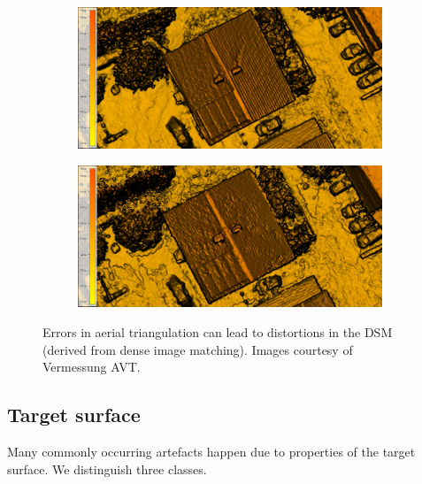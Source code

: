 \begin{figure}
	\begin{subfigure}{0.45\linewidth}
		\includegraphics[width=\textwidth]{figs/Roof_DSM_NA_10cm.jpg}
		\label{fig:dim:b}
	\end{subfigure}
	\quad
	\begin{subfigure}{0.45\linewidth}
		\includegraphics[width=\textwidth]{figs/Roof_DSM_NA+OBL_10cm.jpg}
		\label{fig:dim:c}
	\end{subfigure}
	\caption{Errors in aerial triangulation can lead to distortions in the DSM (derived from dense image matching). Images courtesy of Vermessung AVT.}%
\label{fig:dim}
\end{figure}


\subsection{Target surface}
Many commonly occurring  artefacts  happen due to properties of the target surface. We distinguish three classes.

